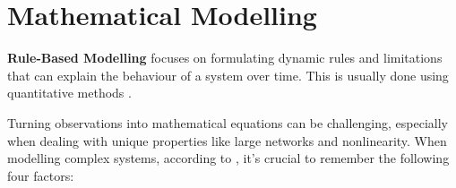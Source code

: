 







\section{Mathematical Modelling}
\label{MathematicalModellingLitRev}

\textbf{Rule-Based Modelling} focuses on formulating dynamic rules and limitations that can explain the behaviour of a system over time. This is usually done using quantitative methods \cite{SayamaINTRODUCTIONSYSTEMS}.

Turning observations into mathematical equations can be challenging, especially when dealing with unique properties like large networks and nonlinearity. When modelling complex systems, according to \cite{SayamaINTRODUCTIONSYSTEMS}, it's crucial to remember the following four factors:

